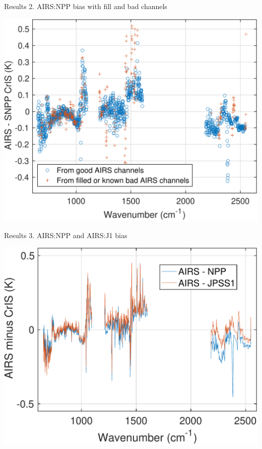 \documentclass[10pt,t]{beamer}
\begin{document}
\begin{frame}{Results 2. AIRS:NPP bias with fill and bad channels}

\vspace{-0.1in}
  \begin{center}
   \includegraphics[width=0.7\linewidth]{./Strow/lls_2018_airs_npp_ac1_stats_bias_wbad_fill_v2.pdf}
  \end{center}
    
\end{frame}

\begin{frame}{Results 3. AIRS:NPP and AIRS:J1 bias}

\vspace{-0.1in}
  \begin{center}
    \includegraphics[width=0.7\linewidth]{./Figs/2018d060_2019d059_ac1_ac2_sno_mean_bias_v2.pdf}
  \end{center}
    
\end{frame}
\end{document}
